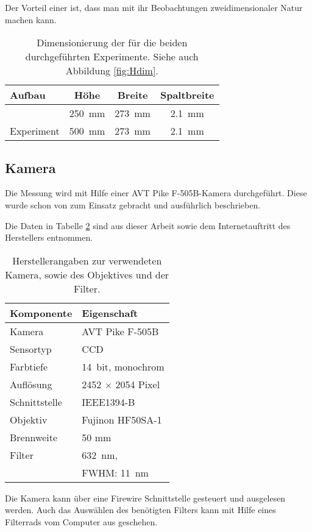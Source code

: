 Der Vorteil einer \HSC ist, dass man mit ihr Beobachtungen zweidimensionaler Natur machen kann.


\begin{table}[b]
  \begin{tabularx}{\linewidth}{X|c|c|c} %
    Aufbau			& Höhe				& Breite			& Spaltbreite \\
    \hline\hline
    \COTm 			& \SI{ 250}{\milli\meter}	& \SI{273}{\milli\meter}	& \SI[round-precision=1]{2,1}{\milli\meter} \\
    Experiment			& \SI{ 500}{\milli\meter}	& \SI{273}{\milli\meter}	& \SI[round-precision=1]{2,1}{\milli\meter}
  \end{tabularx}
  \caption{Dimensionierung der \HSCs für die beiden durchgeführten Experimente. Siehe auch Abbildung \ref{fig:Hdim}.}
  \label{tab:Hdim}
\end{table}

\subsection{Kamera}
\label{sec:cam}
Die Messung wird mit Hilfe einer AVT Pike F-505B-Kamera durchgeführt. Diese wurde schon von \cite{heberle} zum Einsatz gebracht und ausführlich
beschrieben. 

Die Daten in Tabelle \ref{tab:cam} sind aus dieser Arbeit sowie dem Internetauftritt des Herstellers \citep{pike_sheet} entnommen. 
\begin{table}[b]
 \begin{tabularx}{\linewidth}{X|X}
  Komponente	& Eigenschaft \\
  \hline\hline
  Kamera	& AVT Pike F-505B \\
  Sensortyp	& CCD \\
  Farbtiefe	& \SI{14}{bit}, monochrom \\
  Auflösung	& 2452 $\times$ 2054 Pixel \\
  Schnittstelle	& IEEE1394-B \\
  \hline
  Objektiv	& Fujinon HF50SA-1 \\
  Brennweite	& 50 mm \\
  \hline
  Filter	& \SI{632}{\nano\meter}, \\
		& FWHM: \SI{11}{\nano\meter} 
 \end{tabularx}
 \caption{Herstellerangaben zur verwendeten Kamera, sowie des Objektives und der Filter.}
 \label{tab:cam}
\end{table}
Die Kamera kann über eine Firewire Schnittstelle gesteuert und ausgelesen werden. Auch das Auswählen des benötigten Filters kann mit Hilfe eines Filterrads
vom Computer aus geschehen.


